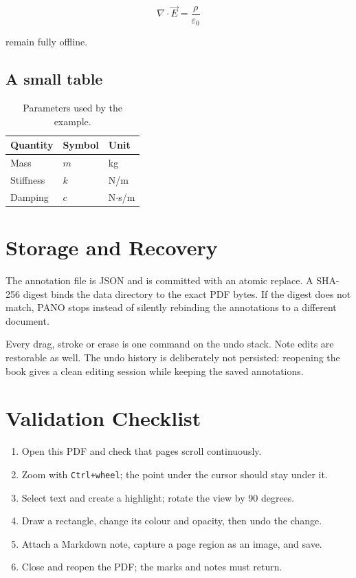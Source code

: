 \documentclass[11pt,a4paper]{article}
\begin{document}
\[
  \nabla \cdot \vec{E} = \frac{\rho}{\varepsilon_0}
\]

remain fully offline.

\subsection{A small table}
\begin{table}[h]
\centering
\begin{tabular}{lll}
\toprule
Quantity & Symbol & Unit \\
\midrule
Mass & $m$ & kg \\
Stiffness & $k$ & N/m \\
Damping & $c$ & N$\cdot$s/m \\
\bottomrule
\end{tabular}
\caption{Parameters used by the example.}
\end{table}

\section{Storage and Recovery}
The annotation file is JSON and is committed with an atomic replace. A SHA-256 digest binds the
data directory to the exact PDF bytes. If the digest does not match, PANO stops instead of
silently rebinding the annotations to a different document.

Every drag, stroke or erase is one command on the undo stack. Note edits are restorable as well.
The undo history is deliberately not persisted: reopening the book gives a clean editing
session while keeping the saved annotations.

\section{Validation Checklist}
\begin{enumerate}
  \item Open this PDF and check that pages scroll continuously.
  \item Zoom with \texttt{Ctrl+wheel}; the point under the cursor should stay under it.
  \item Select text and create a highlight; rotate the view by 90 degrees.
  \item Draw a rectangle, change its colour and opacity, then undo the change.
  \item Attach a Markdown note, capture a page region as an image, and save.
  \item Close and reopen the PDF; the marks and notes must return.
\end{enumerate}
\end{document}
